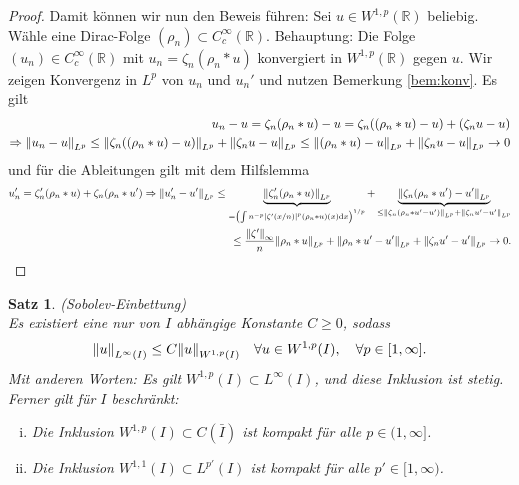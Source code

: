 \documentclass[twoside]{article}
\newcounter{lecnum}
\newtheorem{theorem}{Satz}[lecnum]
\theoremstyle{definition}
\begin{document}
\begin{proof}
Damit können wir nun den Beweis führen: Sei $u \in W^{1,p}(\mathbb{R})$ beliebig. Wähle eine Dirac-Folge $(\rho_n) \subset C_c^\infty(\mathbb{R})$. Behauptung: Die Folge $(u_n) \in C_c^\infty(\mathbb{R})$ mit $u_n = \zeta_n (\rho_n * u)$ konvergiert in $W^{1,p}(\mathbb{R})$ gegen $u$. Wir zeigen Konvergenz in $L^p$ von $u_n$ und $u_n'$ und nutzen Bemerkung \ref{bem:konv}. Es gilt
\begin{align*}
u_n - u = \zeta_n (\rho_n * u) - u = \zeta_n ((\rho_n * u) - u) + (\zeta_n  u - u) \\
\Rightarrow \norm{u_n - u}_{L^p} \leq \norm{\zeta_n ((\rho_n * u) - u)}_{L^p} + \norm{\zeta_n  u - u}_{L^p} \leq  \norm{(\rho_n * u) - u}_{L^p} + \norm{\zeta_n  u - u}_{L^p} \to 0
\end{align*} 
und für die Ableitungen gilt mit dem Hilfslemma
\begin{align*}
u_n' = \zeta_n' (\rho_n * u) + \zeta_n (\rho_n * u') \Rightarrow \norm{u_n'-u'}_{L^p} \leq \underbrace{\norm{\zeta_n' (\rho_n * u)}_{L^p}}_{= \left(\int n^{-p} \abs{\zeta'(x/n)}^p (\rho_n * u)(x) \mathrm{d}x \right)^{1/p}}  + \underbrace{\norm{ \zeta_n (\rho_n * u') - u'}_{L^p} }_{\leq \norm{ \zeta_n (\rho_n * u' - u')}_{L^p} +  \norm{ \zeta_n  u' - u'}_{L^p}}\\
\leq \frac{\norm{\zeta'}_\infty}{n} \norm{\rho_n * u}_{L^p} + \norm{ \rho_n * u' - u'}_{L^p} +  \norm{ \zeta_n  u' - u'}_{L^p} \to 0.
\end{align*}
\end{proof}
\begin{theorem} (Sobolev-Einbettung) \label{thm:einbett}\\
Es existiert eine nur von $I$ abhängige Konstante $C \geq 0$, sodass
\begin{align}
\norm{u}_{L^\infty(I)} \leq C \norm{u}_{W^{1,p}(I)} \quad \forall u \in W^{1,p}(I), \quad \forall p \in [1, \infty]. \label{eq:einbett}
\end{align}
Mit anderen Worten: Es gilt $W^{1,p}(I) \subset L^{\infty}(I)$, und diese Inklusion ist stetig. Ferner gilt für $I$ beschränkt:
\begin{enumerate}[(i)]
\item Die Inklusion $W^{1,p}(I) \subset C(\bar{I})$ ist kompakt für alle $p \in (1,\infty]$.
\item Die Inklusion $W^{1,1}(I) \subset L^{p'}(I)$ ist kompakt für alle $p' \in [1,\infty)$.
\end{enumerate}
\end{theorem}
\end{document}
